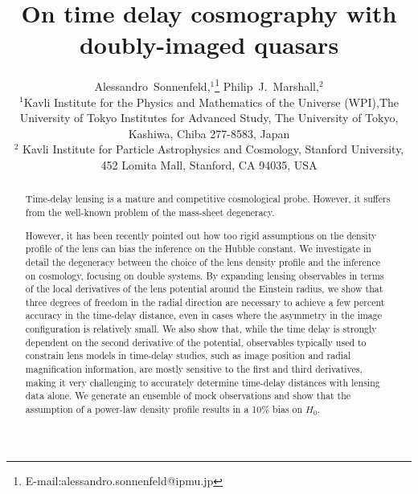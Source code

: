 \documentclass[usenatbib]{mnras}
\begin{document}
\title{On time delay cosmography with doubly-imaged quasars}
\author[Sonnenfeld \& Marshall]{
Alessandro~Sonnenfeld,$^{1}$\thanks{E-mail:alessandro.sonnenfeld@ipmu.jp}
Philip~J.~Marshall,$^{2}$
\\
$^{1}$Kavli Institute for the Physics and Mathematics of the Universe (WPI),The University of Tokyo Institutes for Advanced Study, The University of Tokyo, Kashiwa, Chiba 277-8583, Japan \\
$^{2}$ Kavli Institute for Particle Astrophysics and Cosmology, Stanford University, 452 Lomita Mall, Stanford, CA 94035, USA\\
}

\maketitle

\begin{abstract}
Time-delay lensing is a mature and competitive cosmological probe.
However, it suffers from the well-known problem of the mass-sheet degeneracy.

However, it has been recently pointed out how too rigid assumptions on the density profile of the lens can bias the inference on the Hubble constant.
We investigate in detail the degeneracy between the choice of the lens density profile and the inference on cosmology, focusing on double systems.
By expanding lensing observables in terms of the local derivatives of the lens potential around the Einstein radius, 
we show that three degrees of freedom in the radial direction are necessary to achieve a few percent accuracy in the time-delay distance, even in cases where the asymmetry in the image configuration is relatively small.
We also show that, while the time delay is strongly dependent on the second derivative of the potential, observables typically used to constrain lens models in time-delay studies, such as image position and radial magnification information, are mostly sensitive to the first and third derivatives, making it very challenging to accurately determine time-delay distances with lensing data alone.
We generate an ensemble of mock observations and show that the assumption of a power-law density profile results in a 10\% bias on $H_0$.

\end{abstract}
\end{document}
